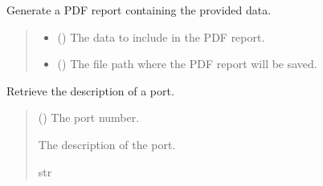 \documentclass[letterpaper,10pt,english]{sphinxmanual}
\begin{document}
\begin{fulllineitems}
\label{\detokenize{portscanner:portscanner.generate_pdf}}
\pysigstartsignatures
{}
\pysigstopsignatures
\sphinxAtStartPar
Generate a PDF report containing the provided data.
\begin{quote}\begin{description}
\begin{itemize}
\item {} 
\sphinxAtStartPar
{} (\sphinxstyleliteralemphasis{\sphinxupquote{{[}}}\sphinxstyleliteralemphasis{\sphinxupquote{{]}}}) \textendash{} The data to include in the PDF report.

\item {} 
\sphinxAtStartPar
{} () \textendash{} The file path where the PDF report will be saved.

\end{itemize}

\end{description}\end{quote}

\end{fulllineitems}


\begin{fulllineitems}
\label{\detokenize{portscanner:portscanner.get_port_description}}
\pysigstartsignatures
{}
\pysigstopsignatures
\sphinxAtStartPar
Retrieve the description of a port.
\begin{quote}\begin{description}
\sphinxAtStartPar
{} () \textendash{} The port number.

\sphinxAtStartPar
The description of the port.

\sphinxAtStartPar
str

\end{description}\end{quote}

\end{fulllineitems}
\end{document}
